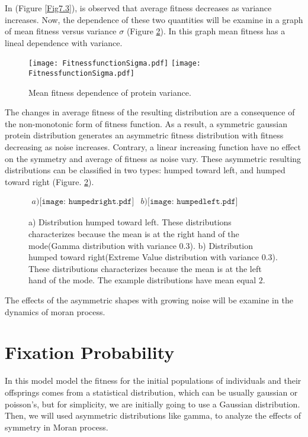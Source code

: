 In (Figure \ref{Fig7.3}), is observed that average fitness decreases as variance increases. Now, the dependence of these two quantities will be examine in a graph of mean fitness versus variance $\sigma$ (Figure \ref{Fig7.4}). In this graph mean fitness has a lineal dependence with variance.
\begin{figure}[H]
  \begin{center}
    \leavevmode
    \ifpdf
      \texttt{[image: FitnessfunctionSigma.pdf]}
    \else
      \texttt{[image: FitnessfunctionSigma.pdf]}
    \fi
    \caption{Mean fitness dependence of protein variance.}
    \label{Fig7.4}
  \end{center}
  \end{figure}
The changes in  average fitness of the resulting distribution are a consequence of the non-monotonic form of fitness function. As a result, a symmetric  gaussian protein distribution generates an asymmetric fitness distribution with fitness decreasing as noise increases. Contrary, a linear increasing function have no effect on the symmetry and average of fitness as noise vary. These asymmetric resulting distributions can be classified in two types: humped toward left, and humped toward right (Figure. \ref{Fig7.4}).
\begin{figure}[H]
\begin{center}$
\begin{array}{cc}
a)\texttt{[image: humpedright.pdf]} &
b)\texttt{[image: humpedleft.pdf]}
\end{array}$
\end{center}
\caption{a) Distribution humped toward left. These distributions characterizes because the mean is at the right hand of the mode(Gamma distribution with variance $0.3$). b) Distribution humped toward right(Extreme Value distribution with variance $0.3$). These distributions characterizes because the mean is at the left hand of the mode. The example distributions have mean equal $2$.}
\label{Fig7.4}
\end{figure}
The effects of the asymmetric shapes with growing  noise will be examine in the dynamics of moran process.

\section{Fixation Probability}
In this model model the fitness for the initial populations of individuals and their offsprings comes from a statistical distribution, which can be usually gaussian or poisson's, but for simplicity, we are initially  going to use a Gaussian distribution. Then, we will used asymmetric  distributions like gamma, to analyze the effects of symmetry in Moran process.

